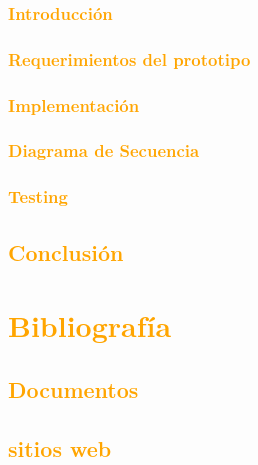 \documentclass[a4paper,11pt]{article}
\begin{document}
		\subsubsection{\textcolor{orange}{Introducción}}
		\subsubsection{\textcolor{orange}{Requerimientos del prototipo}}
		\subsubsection{\textcolor{orange}{Implementación}}
			\subsubsection{\textcolor{orange}{Diagrama de Secuencia}}
			\subsubsection{\textcolor{orange}{Testing}}
		\subsection{\textcolor{orange}{Conclusión}}



	


\section{\textcolor{orange}{Bibliografía}}
\subsection{\textcolor{orange}{Documentos}}
\subsection{\textcolor{orange}{sitios web}}
\end{document}
